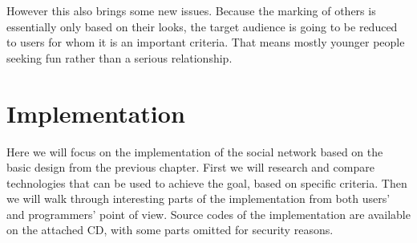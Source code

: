 \documentclass[12pt,oneside]{fithesis}
\begin{document}
	However this also brings some new issues. Because the marking of others is essentially only based on their looks, the target audience is going to be reduced to users for whom it is an important criteria. That means mostly younger people seeking fun rather than a serious relationship.
\chapter{Implementation}
	Here we will focus on the implementation of the social network based on the basic design from the previous chapter. First we will research and compare technologies that can be used to achieve the goal, based on specific criteria. Then we will walk through interesting parts of the implementation from both users' and programmers' point of view. Source codes of the implementation are available on the attached CD, with some parts omitted for security reasons.
\end{document}
